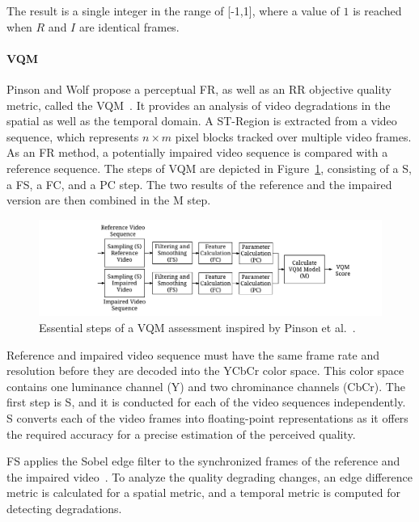 The result is a single integer in the range of [-1,1], where a value of $1$ is reached when $R$ and $I$ are identical frames.
\paragraph{VQM}
Pinson and Wolf propose a perceptual \ac{FR}, as well as an \ac{RR} objective quality metric, called the \acf{VQM}~\cite{Pinson2004}.
It provides an analysis of video degradations in the spatial as well as the temporal domain.
A \ac{ST-Region} is extracted from a video sequence, which represents $n \times m$ pixel blocks tracked over multiple video frames.
As an \ac{FR} method, a potentially impaired video sequence is compared with a reference sequence.
The steps of \ac{VQM} are depicted in Figure~\ref{fig:220_vqmsteps}, consisting of a \acf{S}, a \acf{FS}, a \acf{FC}, and a \acf{PC} step.
The two results of the reference and the impaired version are then combined in the \ac{M} step.

\begin{figure}[t]
	\centering
	\includegraphics[width=\textwidth]{./gfx/200_Background/VQM_Steps}
	\caption[VQM assessment steps]{Essential steps of a VQM assessment inspired by Pinson et al.~\cite{Pinson2004}.}
	\label{fig:220_vqmsteps}
\end{figure}
 
Reference and impaired video sequence must have the same frame rate and resolution before they are decoded into the YCbCr color space.
This color space contains one luminance channel (Y) and two chrominance channels (CbCr).
The first step is \acf{S}, and it is conducted for each of the video sequences independently. 
\ac{S} converts each of the video frames into floating-point representations as it offers the required accuracy for a precise estimation of the perceived quality.

\acf{FS} applies the Sobel edge filter to the synchronized frames of the reference and the impaired video~\cite{Sobel1968}. 
To analyze the quality degrading changes, an edge difference metric is calculated for a spatial metric, and a temporal metric is computed for detecting degradations.

